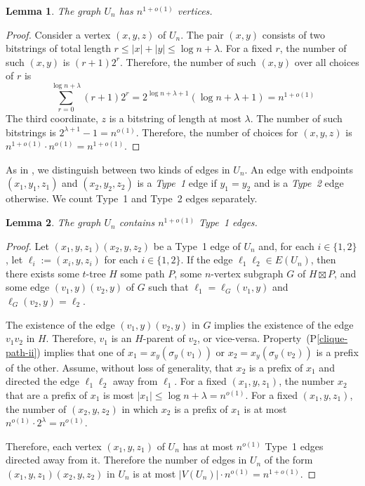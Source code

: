 \documentclass{patmorin}
\newcommand{\pref}[1]{(P\ref{#1})}
\newtheorem{lemma}{Lemma}
\begin{document}
\begin{lemma}
    The graph $U_n$ has $n^{1+o(1)}$ vertices.
\end{lemma}

\begin{proof}
    Consider a vertex $(x,y,z)$ of $U_n$. The pair $(x,y)$ consists of two bitstrings of total length $r \le |x|+|y|\le\log n + \lambda$.  For a fixed $r$, the number of such $(x,y)$ is $(r+1)2^{r}$. Therefore, the number of such $(x,y)$ over all choices of $r$ is
    \[
        \sum_{r=0}^{\log n + \lambda} (r+1)2^r = 2^{\log n + \lambda+1}(\log n+\lambda + 1) = n^{1+o(1)}
    \]
    The third coordinate, $z$ is a bitstring of length at most $\lambda$. The number of such bitstrings is $2^{\lambda+1}-1=n^{o(1)}$.  Therefore, the number of choices for $(x,y,z)$ is $n^{1+o(1)}\cdot n^{o(1)}=n^{1+o(1)}$.
\end{proof}

As in \cite{esperet.joret.ea:sparse}, we distinguish between two kinds of edges in $U_n$.  An edge with endpoints $(x_1,y_1,z_1)$ and $(x_2,y_2,z_2)$ is a \emph{Type~1} edge if $y_1=y_2$ and is a \emph{Type~2} edge otherwise.  We count Type~1 and Type~2 edges separately.

\begin{lemma}\label{flat-edges}
    The graph $U_n$ contains $n^{1+o(1)}$ Type~1 edges.
\end{lemma}

\begin{proof}
    Let $(x_1,y,z_1)(x_2,y,z_2)$ be a Type~1 edge of $U_n$ and, for each $i\in\{1,2\}$, let $\ell_i:=(x_i,y,z_i)$ for each $i\in\{1,2\}$.  If the edge $\ell_1\ell_2\in E(U_n)$, then there exists some $t$-tree $H$ some path $P$, some $n$-vertex subgraph $G$ of $H\boxtimes P$, and some edge $(v_1,y)(v_2,y)$ of $G$ such that $\ell_1=\ell_G(v_1,y)$ and $\ell_G(v_2,y)=\ell_2$.

    The existence of the edge $(v_1,y)(v_2,y)$ in $G$ implies the existence of the edge $v_1v_2$ in $H$.  Therefore, $v_1$ is an $H$-parent of $v_2$, or vice-versa. Property~\pref{clique-path-ii} implies that one of $x_1=x_y(\sigma_y(v_1))$ or $x_2=x_y(\sigma_y(v_2))$ is a prefix of the other.  Assume, without loss of generality, that $x_2$ is a prefix of $x_1$ and directed the edge $\ell_1\ell_2$ away from $\ell_1$.  For a fixed $(x_1,y,z_1)$, the number $x_2$ that are a prefix of $x_1$ is most $|x_1|\le\log n+\lambda=n^{o(1)}$. For a fixed $(x_1,y,z_1)$, the number of $(x_2,y,z_2)$ in which $x_2$ is a prefix of $x_1$ is at most $n^{o(1)}\cdot 2^{\lambda}=n^{o(1)}$.

    Therefore, each vertex $(x_1,y,z_1)$ of $U_n$ has at most $n^{o(1)}$ Type~1 edges directed away from it.  Therefore the number of edges in $U_n$ of the form $(x_1,y,z_1)(x_2,y,z_2)$ in $U_n$ is at most $|V(U_n)|\cdot n^{o(1)}=n^{1+o(1)}$.
\end{proof}
\end{document}
